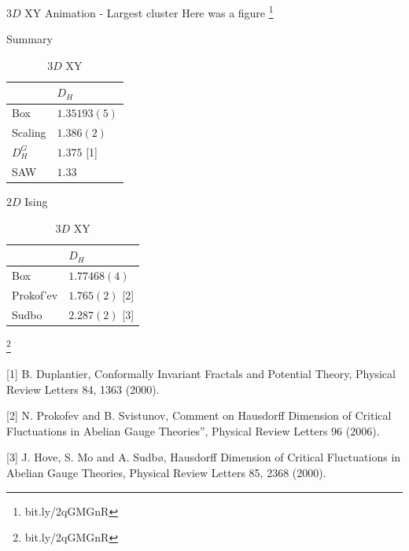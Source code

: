 \documentclass[10pt]{beamer}
\newcommand\blfootnote[1]{%
  \begingroup
  \renewcommand\thefootnote{}\footnote{#1}%
  \addtocounter{footnote}{-1}%
  \endgroup
}
\begin{document}

\begin{frame}{$3D$ XY Animation - Largest cluster}
        Here was a figure
           \blfootnote{bit.ly/2qGMGnR}
\end{frame}

\begin{frame}{Summary}
    \begin{table}
        \parbox{.45\linewidth}{
            \centering
            \begin{tabular}{l|l}
                               & $D_H$          \\ \hline
                Box            & $1.35193(5)$   \\ \hline
                Scaling        & $1.386(2)$      \\ \hline
                $D_H^G$        & $1.375$ [1]       \\ \hline
                SAW            & $1.33$                              
            \end{tabular}
            \caption{$2D$ Ising}
        }
        \hfill
        \parbox{.45\linewidth}{
            \centering
            \begin{tabular}{l|l}
                            & $D_H$           \\ \hline
                Box         & $1.77468(4)$    \\ \hline
                Prokof'ev   & $1.765(2)$ [2]      \\ \hline
                Sudbo       & $2.287(2)$ [3] 
            \end{tabular}
            \caption{$3D$ XY}
        }
    \end{table}
    \blfootnote{bit.ly/2qGMGnR}

\footnotesize [1] B. Duplantier, Conformally Invariant Fractals and Potential Theory, Physical Review Letters 84, 1363 (2000).
    
\footnotesize [2] N. Prokofev and B. Svistunov, Comment on Hausdorff Dimension of Critical Fluctuations in Abelian Gauge Theories”, Physical Review Letters 96 (2006).

\footnotesize [3] J. Hove, S. Mo and A. Sudbø, Hausdorff Dimension of Critical Fluctuations in Abelian Gauge Theories, Physical Review Letters 85, 2368 (2000).

\end{frame}
\end{document}
